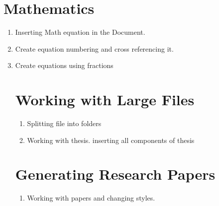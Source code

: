 \documentclass[11pt,a4paper]{article}
\begin{document}
\section{Mathematics}
\begin{enumerate}
\item Inserting Math equation in the Document.
\item Create equation numbering and cross referencing it.
\item Create equations using fractions

\section{Working with Large Files}
\begin{enumerate}
\item Splitting file into folders
\item Working with thesis. inserting all components of thesis
\end{enumerate}

\section{Generating Research Papers}
\begin{enumerate}

\item Working with papers and changing styles. 
\end{enumerate}


\end{enumerate}
\end{document}
